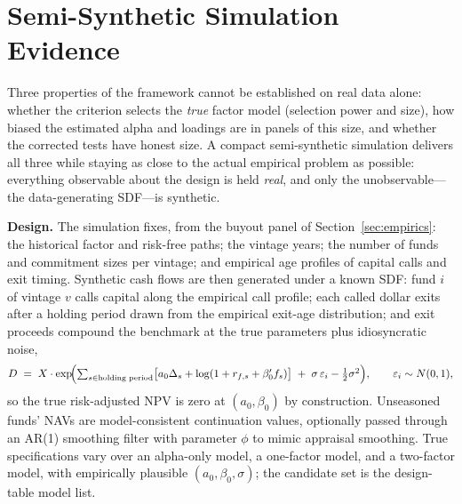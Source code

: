 \documentclass[11pt]{article}
\begin{document}
\section{Semi-Synthetic Simulation Evidence}
\label{sec:simulation}

Three properties of the framework cannot be established on real data alone: whether the criterion selects the \emph{true} factor model (selection power and size), how biased the estimated alpha and loadings are in panels of this size, and whether the corrected tests have honest size. A compact semi-synthetic simulation delivers all three while staying as close to the actual empirical problem as possible: everything observable about the design is held \emph{real}, and only the unobservable---the data-generating SDF---is synthetic.

\textbf{Design.} The simulation fixes, from the buyout panel of Section~\ref{sec:empirics}: the historical factor and risk-free paths; the vintage years; the number of funds and commitment sizes per vintage; and empirical age profiles of capital calls and exit timing. Synthetic cash flows are then generated under a known SDF: fund \(i\) of vintage \(v\) calls capital along the empirical call profile; each called dollar exits after a holding period drawn from the empirical exit-age distribution; and exit proceeds compound the benchmark at the true parameters plus idiosyncratic noise,
\[
D \;=\; X\cdot\exp\!\Bigl(\textstyle\sum_{s\in\text{holding period}}\bigl[a_0\Delta_s+\log(1+r_{f,s}+\beta_0^\prime f_s)\bigr]\;+\;\sigma\,\varepsilon_i-\tfrac12\sigma^2\Bigr),
\qquad \varepsilon_i\sim N(0,1),
\]
so the true risk-adjusted NPV is zero at \((a_0,\beta_0)\) by construction. Unseasoned funds' NAVs are model-consistent continuation values, optionally passed through an AR(1) smoothing filter with parameter \(\phi\) to mimic appraisal smoothing. True specifications vary over an alpha-only model, a one-factor model, and a two-factor model, with empirically plausible \((a_0,\beta_0,\sigma)\); the candidate set is the design-table model list.
\end{document}
